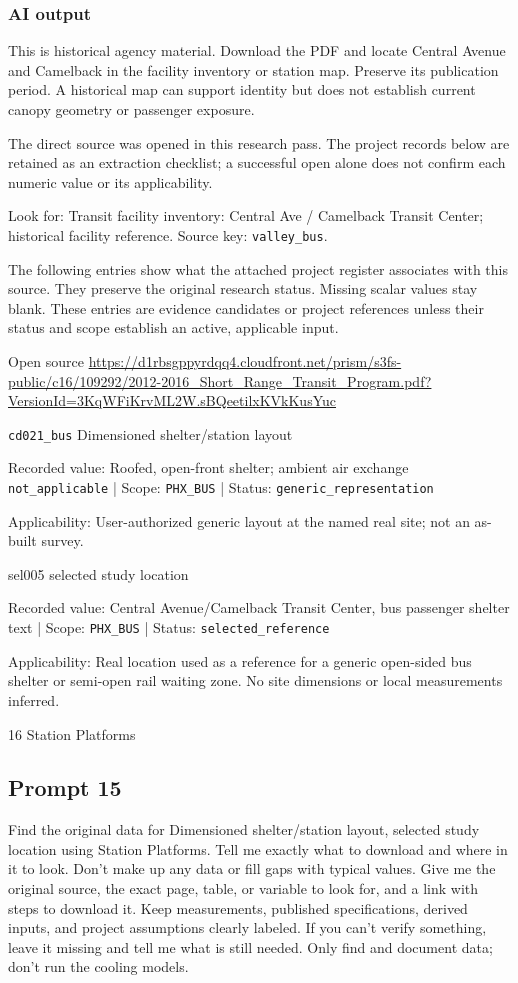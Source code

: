 \subsubsection*{AI output}
This is historical agency material. Download the PDF and locate Central Avenue and Camelback in the facility inventory or station map. Preserve its publication period. A historical map can support identity but does not establish current canopy geometry or passenger exposure.

The direct source was opened in this research pass. The project records below are retained as an extraction checklist; a successful open alone does not confirm each numeric value or its applicability.

Look for: Transit facility inventory: Central Ave / Camelback Transit Center; historical facility reference. Source key: \nolinkurl{valley_bus}.

The following entries show what the attached project register associates with this source. They preserve the original research status. Missing scalar values stay blank. These entries are evidence candidates or project references unless their status and scope establish an active, applicable input.

Open source  \url{https://d1rbsgppyrdqq4.cloudfront.net/prism/s3fs-public/c16/109292/2012-2016_Short_Range_Transit_Program.pdf?VersionId=3KqWFiKrvML2W.sBQeetilxKVkKusYuc}

\nolinkurl{cd021_bus}  Dimensioned shelter/station layout

Recorded value: Roofed, open-front shelter; ambient air exchange \nolinkurl{not_applicable} | Scope: \nolinkurl{PHX_BUS} | Status: \nolinkurl{generic_representation}

Applicability: User-authorized generic layout at the named real site; not an as-built survey.

sel005  selected study location

Recorded value: Central Avenue/Camelback Transit Center, bus passenger shelter text | Scope: \nolinkurl{PHX_BUS} | Status: \nolinkurl{selected_reference}

Applicability: Real location used as a reference for a generic open-sided bus shelter or semi-open rail waiting zone. No site dimensions or local measurements inferred.

16 Station Platforms

\subsection*{Prompt 15}
Find the original data for Dimensioned shelter/station layout, selected study location using Station Platforms. Tell me exactly what to download and where in it to look. Don’t make up any data or fill gaps with typical values. Give me the original source, the exact page, table, or variable to look for, and a link with steps to download it. Keep measurements, published specifications, derived inputs, and project assumptions clearly labeled. If you can’t verify something, leave it missing and tell me what is still needed. Only find and document data; don’t run the cooling models.

